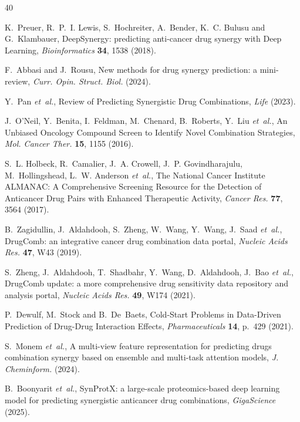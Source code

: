 \documentclass{ws-procs11x85}
\begin{document}

\begin{thebibliography}{40}

K.~Preuer, R.~P.~I. Lewis, S.~Hochreiter, A.~Bender, K.~C. Bulusu and
  G.~Klambauer, DeepSynergy: predicting anti-cancer drug synergy with Deep
  Learning, {\it Bioinformatics} {\bf 34}, 1538 (2018).

F.~Abbasi and J.~Rousu, New methods for drug synergy prediction: a mini-review,
  {\it Curr. Opin. Struct. Biol.}  (2024).

Y.~Pan {\it et~al.}, Review of Predicting Synergistic Drug Combinations, {\it
  Life}  (2023).

J.~O'Neil, Y.~Benita, I.~Feldman, M.~Chenard, B.~Roberts, Y.~Liu {\it et~al.},
  An Unbiased Oncology Compound Screen to Identify Novel Combination Strategies,
  {\it Mol. Cancer Ther.} {\bf 15}, 1155 (2016).

S.~L. Holbeck, R.~Camalier, J.~A. Crowell, J.~P. Govindharajulu,
  M.~Hollingshead, L.~W. Anderson {\it et~al.}, The National Cancer Institute
  ALMANAC: A Comprehensive Screening Resource for the Detection of Anticancer
  Drug Pairs with Enhanced Therapeutic Activity, {\it Cancer Res.} {\bf 77}, 3564
  (2017).

B.~Zagidullin, J.~Aldahdooh, S.~Zheng, W.~Wang, Y.~Wang, J.~Saad {\it et~al.},
  DrugComb: an integrative cancer drug combination data portal, {\it Nucleic
  Acids Res.} {\bf 47}, W43 (2019).

S.~Zheng, J.~Aldahdooh, T.~Shadbahr, Y.~Wang, D.~Aldahdooh, J.~Bao {\it
  et~al.}, DrugComb update: a more comprehensive drug sensitivity data
  repository and analysis portal, {\it Nucleic Acids Res.} {\bf 49}, W174 (2021).

P.~Dewulf, M.~Stock and B.~De~Baets, Cold-Start Problems in Data-Driven
  Prediction of Drug-Drug Interaction Effects, {\it Pharmaceuticals} {\bf 14},
  p.~429 (2021).

S.~Monem {\it et~al.}, A multi-view feature representation for predicting drugs
  combination synergy based on ensemble and multi-task attention models, {\it J.
  Cheminform.}  (2024).

B.~Boonyarit {\it et~al.}, SynProtX: a large-scale proteomics-based deep
  learning model for predicting synergistic anticancer drug combinations, {\it
  GigaScience}  (2025).


\end{thebibliography}
\end{document}
